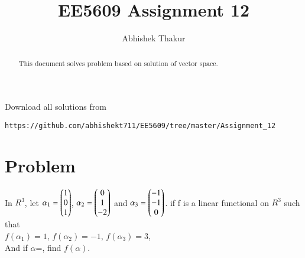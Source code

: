 \documentclass[journal,12pt,twocolumn]{IEEEtran}
\begin{document}
     \def\rightbox#1{\makebox[0in][r]{#1}}
     \def\centbox#1{\makebox[0in]{#1}}
     \def\topbox#1{\raisebox{-\baselineskip}[0in][0in]{#1}}
     \def\midbox#1{\raisebox{-0.5\baselineskip}[0in][0in]{#1}}
\vspace{3cm}
\title{EE5609 Assignment 12}
\author{Abhishek Thakur}
\maketitle
\newpage
\bigskip
\renewcommand{\thefigure}{\theenumi}
\renewcommand{\thetable}{\theenumi}
\begin{abstract}
This document solves problem based on solution of vector space.
\end{abstract}
Download all solutions from 
\begin{lstlisting}
https://github.com/abhishekt711/EE5609/tree/master/Assignment_12
\end{lstlisting}
\section{Problem}
In $R^3$, let $\alpha_1 = \begin{pmatrix}1\\0\\1\end{pmatrix}$, $\alpha_2 =\begin{pmatrix}0\\1\\-2\end{pmatrix}$ and 
$\alpha_3 =\begin{pmatrix}-1\\-1\\0\end{pmatrix}$. 
if f is a linear functional on $R^3$ such that\\ $f(\alpha_1)=1$, $f(\alpha_2)=-1$,  $f(\alpha_3)=3$,\\ And if $\alpha$=, find $f(\alpha)$.
\end{document}
